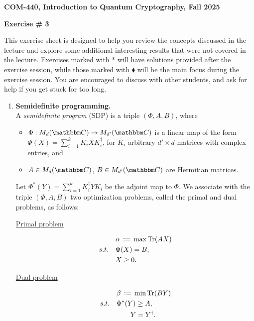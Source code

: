 \documentclass[12pt]{article}
\newcommand{\header}[1]{\begin{center} {\large\bf #1} \end{center}}
\begin{document}
\header{COM-440, Introduction to Quantum Cryptography, Fall 2025}
\header{\bf Exercise \# 3}

This exercise sheet is designed to help you review the concepts discussed in the lecture and explore some additional interesting results that were not covered in the lecture. Exercises marked with * will have solutions provided after the exercise session, while those marked with $\blacklozenge$ will be the main focus during the exercise session. You are encouraged to discuss with other students, and ask for help if you get stuck for too long.

\begin{enumerate}

\item  \textbf{Semidefinite programming.}\\
A \emph{semidefinite program} (SDP) is a triple $(\Phi,A,B)$, where
\begin{itemize}
\item $\Phi: M_d(\C)\to M_{d'}(\C)$ is a linear map of the form $\Phi(X) = \sum_{i=1}^k K_i X K_i^\dagger$, for $K_i$ arbitrary $d'\times d$ matrices with complex entries, and
\item $A \in M_d(\C)$, $B\in M_{d'}(\C)$ are Hermitian matrices.
\end{itemize}
Let $\Phi^*(Y) = \sum_{i=1}^k K_i^\dagger Y K_i$ be the adjoint map to $\Phi$. 
We associate with the triple $(\Phi, A, B)$ two optimization problems, called the primal and dual problems, as follows:
\begin{center}
  \begin{minipage}{2.5in}
 \centerline{\underline{Primal problem}}\vskip-4mm
\begin{align}
&\alpha\,:=\,  \max \mathrm{Tr}(AX)\notag \\
s.t.\quad& \Phi(X)=B,\notag \\
& X \geq 0.\notag
\end{align}
  \end{minipage}
  \hspace*{13mm}
  \begin{minipage}{2.5in}
 \centerline{\underline{Dual problem}}\vskip-4mm
\begin{align}
&\beta\,:=\,  \min \mathrm{Tr}(BY) \notag\\
s.t.\quad&  \Phi^*(Y)\geq A,\notag\\
&\qquad Y=Y^\dagger.\notag
\end{align}
 \end{minipage}
\end{center}

\end{enumerate}
\end{document}
